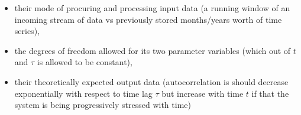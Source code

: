 \begin{itemize}
	\item their mode of procuring and processing input data (a running window of an incoming stream of data vs previously stored months/years worth of time series),
	\item the degrees of freedom allowed for its two parameter variables (which out of $t$ and $\tau$ is allowed to be constant),
	\item their theoretically expected output data (autocorrelation is should decrease exponentially with respect to time lag $\tau$ but increase with time $t$ if that the system is being progressively stressed with time)
\end{itemize} 
 
 